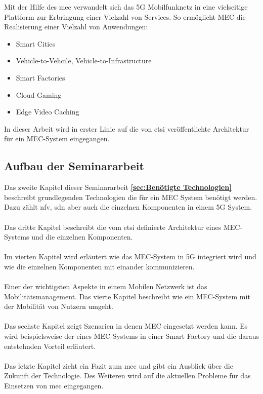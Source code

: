 \documentclass[runningheads]{llncs}
\numberwithin{figure}{section}
\begin{document}
Mit der Hilfe des \acrfull{mec} verwandelt sich das 5G Mobilfunknetz in eine vielseitige Plattform zur Erbringung 
einer Vielzahl von Services. So ermöglicht MEC die Realisierung einer Vielzahl von Anwendungen:
\begin{itemize}
  \item Smart Cities
  \item Vehicle-to-Vehcile, Vehicle-to-Infrastructure
  \item Smart Factories
  \item Cloud Gaming 
  \item Edge Video Caching
\end{itemize}
In dieser Arbeit wird in erster Linie auf die von \acrshort{etsi} veröffentlichte Architektur für ein MEC-System eingegangen.
\subsection{Aufbau der Seminararbeit}
Das zweite Kapitel dieser Seminararbeit \textbf{ \ref{sec:Benötigte Technologien}} beschreibt
grundlegenden Technologien die für ein MEC System benötigt werden. Dazu zählt \acrfull{nfv}, \acrfull{sdn} aber auch die einzelnen  Komponenten in einem 5G System.
\\
\\
Das dritte Kapitel beschreibt die vom \acrlong{etsi} definierte Architektur eines MEC-Systems und die einzelnen Komponenten.
\\
\\
Im vierten Kapitel wird erläutert wie das MEC-System in 5G integriert wird und wie die einzelnen Komponenten mit einander kommunizieren.
\\
\\
Einer der wichtigsten Aspekte in einem Mobilen Netzwerk ist das Mobilitätsmanagement. Das vierte Kapitel beschreibt wie ein MEC-System mit der Mobilität von
Nutzern umgeht.
\\
\\
Das sechste Kapitel zeigt Szenarien in denen MEC eingesetzt werden kann. Es wird beispielsweise der eines MEC-Systems in einer Smart Factory und die daraus entstehnden
Vorteil erläutert.
\\
\\
Das letzte Kapitel zieht ein Fazit zum \acrlong{mec} und gibt ein Ausblick über die Zukunft der Technologie. 
Des Weiteren wird auf die aktuellen Probleme für das Einsetzen von \acrshort{mec} eingegangen.
\end{document}
